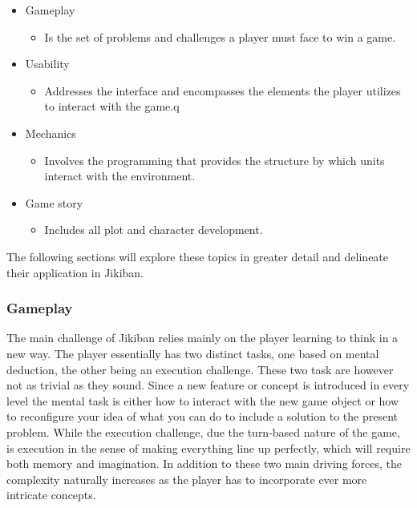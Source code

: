 \begin{itemize}

\item Gameplay
\begin{itemize}
\item Is the set of problems and challenges a player must face to win a game.
\end{itemize}

\item Usability
\begin{itemize}
\item Addresses the interface and encompasses the elements the player
  utilizes to interact with the game.q
\end{itemize}

\item Mechanics
\begin{itemize}
\item Involves the programming that provides the structure by which
  units interact with the environment.
\end{itemize}

\item Game story
\begin{itemize}
\item Includes all plot and character development.
\end{itemize}
\end{itemize}

The following sections will explore these topics in greater detail and
delineate their application in Jikiban.

\subsubsection{Gameplay}
The main challenge of Jikiban relies mainly on the player learning to
think in a new way. The player essentially has two distinct tasks, one
based on mental deduction, the other being an execution challenge.
These two task are however not as trivial as they sound. Since a new
feature or concept is introduced in every level the mental task is
either how to interact with the new game object or how to reconfigure
your idea of what you can do to include a solution to the present
problem. While the execution challenge, due the turn-based nature of
the game, is execution in the sense of making everything line up
perfectly, which will require both memory and imagination. In addition
to these two main driving forces, the complexity naturally increases
as the player has to incorporate ever more intricate concepts.

